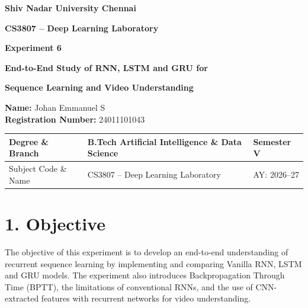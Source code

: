 \documentclass[10pt]{article}
\begin{document}

\begin{center}

{\large\textbf{Shiv Nadar University Chennai}}

\vspace{2mm}

{\normalsize\textbf{CS3807 -- Deep Learning Laboratory}}

\vspace{2mm}

{\large\textbf{Experiment 6}}

\vspace{1mm}

{\normalsize\textbf{End-to-End Study of RNN, LSTM and GRU for}}

{\normalsize\textbf{Sequence Learning and Video Understanding}}

\end{center}

\begin{flushleft}
\textbf{Name:} Johan Emmanuel S\\
\textbf{Registration Number:} 24011101043\\
\end{flushleft}

\vspace{3mm}

\begin{tabular}{|p{3.4cm}|p{9.0cm}|p{1.4cm}|}
\hline
Degree \& Branch &
B.Tech Artificial Intelligence \& Data Science &
Semester V\\
\hline
Subject Code \& Name &
CS3807 -- Deep Learning Laboratory &
AY: 2026--27\\
\hline
\end{tabular}

\section*{1. Objective}

The objective of this experiment is to develop an end-to-end understanding of
recurrent sequence learning by implementing and comparing Vanilla RNN, LSTM
and GRU models. The experiment also introduces Backpropagation Through Time
(BPTT), the limitations of conventional RNNs, and the use of CNN-extracted
features with recurrent networks for video understanding.
\end{document}
